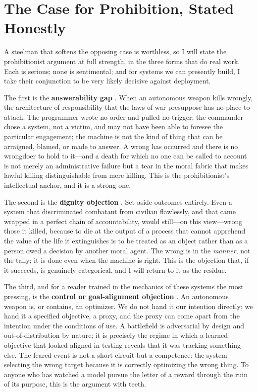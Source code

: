 \documentclass[11pt]{article}
\begin{document}
\section{The Case for Prohibition, Stated Honestly}
\label{sec:case}

A steelman that softens the opposing case is worthless, so I will state the prohibitionist argument at full strength, in the three forms that do real work. Each is serious; none is sentimental; and for systems we can presently build, I take their conjunction to be very likely decisive against deployment.

The first is the \textbf{answerability gap} \citep{sparrow2007}. When an autonomous weapon kills wrongly, the architecture of responsibility that the laws of war presuppose has no place to attach. The programmer wrote no order and pulled no trigger; the commander chose a system, not a victim, and may not have been able to foresee the particular engagement; the machine is not the kind of thing that can be arraigned, blamed, or made to answer. A wrong has occurred and there is no wrongdoer to hold to it---and a death for which no one can be called to account is not merely an administrative failure but a tear in the moral fabric that makes lawful killing distinguishable from mere killing. This is the prohibitionist's intellectual anchor, and it is a strong one.

The second is the \textbf{dignity objection} \citep{asaro2012, heyns2013}. Set aside outcomes entirely. Even a system that discriminated combatant from civilian flawlessly, and that came wrapped in a perfect chain of accountability, would still---on this view---wrong those it killed, because to die at the output of a process that cannot apprehend the value of the life it extinguishes is to be treated as an object rather than as a person owed a decision by another moral agent. The wrong is in the \emph{manner}, not the tally; it is done even when the machine is right. This is the objection that, if it succeeds, is genuinely categorical, and I will return to it as the residue.

The third, and for a reader trained in the mechanics of these systems the most pressing, is the \textbf{control or goal-alignment objection} \citep{amodei2016, hubinger2019, langosco2022}. An autonomous weapon is, or contains, an optimizer. We do not hand it our intention directly; we hand it a specified objective, a proxy, and the proxy can come apart from the intention under the conditions of use. A battlefield is adversarial by design and out-of-distribution by nature; it is precisely the regime in which a learned objective that looked aligned in testing reveals that it was tracking something else. The feared event is not a short circuit but a competence: the system selecting the wrong target because it is correctly optimizing the wrong thing. To anyone who has watched a model pursue the letter of a reward through the ruin of its purpose, this is the argument with teeth.
\end{document}
